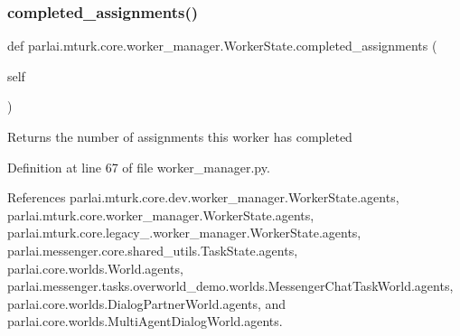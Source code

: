\mbox{\label{classparlai_1_1mturk_1_1core_1_1worker__manager_1_1WorkerState_ae38b2ad12b9cf5282bb025d3b60e7e61}} 
\subsubsection{\texorpdfstring{completed\+\_\+assignments()}{completed\_assignments()}}
{\footnotesize\ttfamily def parlai.\+mturk.\+core.\+worker\+\_\+manager.\+Worker\+State.\+completed\+\_\+assignments (\begin{DoxyParamCaption}\item[{}]{self }\end{DoxyParamCaption})}

\begin{DoxyVerb}Returns the number of assignments this worker has completed\end{DoxyVerb}
 

Definition at line 67 of file worker\+\_\+manager.\+py.



References parlai.\+mturk.\+core.\+dev.\+worker\+\_\+manager.\+Worker\+State.\+agents, parlai.\+mturk.\+core.\+worker\+\_\+manager.\+Worker\+State.\+agents, parlai.\+mturk.\+core.\+legacy\+\_.\+worker\+\_\+manager.\+Worker\+State.\+agents, parlai.\+messenger.\+core.\+shared\+\_\+utils.\+Task\+State.\+agents, parlai.\+core.\+worlds.\+World.\+agents, parlai.\+messenger.\+tasks.\+overworld\+\_\+demo.\+worlds.\+Messenger\+Chat\+Task\+World.\+agents, parlai.\+core.\+worlds.\+Dialog\+Partner\+World.\+agents, and parlai.\+core.\+worlds.\+Multi\+Agent\+Dialog\+World.\+agents.

\mbox{\label{classparlai_1_1mturk_1_1core_1_1worker__manager_1_1WorkerState_a0cfe653c2c2df23393da636c3106a3de}} 
